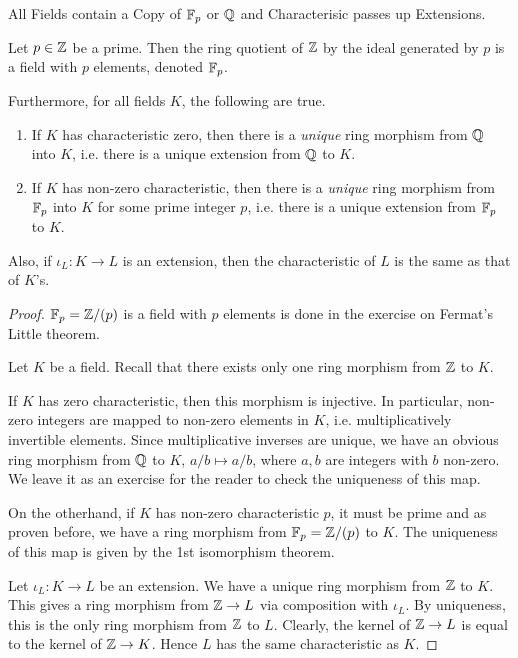 \documentclass[../book.tex]{subfiles}
\begin{document}
\begin{thm} All Fields contain a Copy of $\mathbb{F}_p$ or $\mathbb{Q}$ and 
Characterisic passes up Extensions.
    
    Let $p \in \mathbb{Z}$ be a prime. 
    Then the ring quotient of $\mathbb{Z}$ by the ideal generated by $p$ 
    is a field with $p$ elements, denoted $\mathbb{F}_p$.
    
    Furthermore, for all fields $K$, the following are true. 
    \begin{enumerate}
        \item If $K$ has characteristic zero, 
        then there is a \emph{unique} ring morphism from $\mathbb{Q}$ into $K$,
        i.e. there is a unique extension from $\mathbb{Q}$ to $K$.
        \item If $K$ has non-zero characteristic,
        then there is a \emph{unique} ring morphism from $\mathbb{F}_p$ into $K$
        for some prime integer $p$,
        i.e. there is a unique extension from $\mathbb{F}_p$ to $K$.
    \end{enumerate}
    Also, if $\iota_L : K \to L$ is an extension,
    then the characteristic of $L$ is the same as that of $K$'s.
    
\end{thm}
\begin{proof}
    
    $\mathbb{F}_p = \mathbb{Z} / (p) $ is a field with $p$ elements is done 
    in the exercise on Fermat's Little theorem.
    
    Let $K$ be a field. 
    Recall that there exists only one ring morphism from $\mathbb{Z}$ to $K$. 
    
    If $K$ has zero characteristic, then this morphism is injective.
    In particular, non-zero integers are mapped to non-zero elements in $K$,
    i.e. multiplicatively invertible elements. 
    Since multiplicative inverses are unique, 
    we have an obvious ring morphism from $\mathbb{Q}$ to $K$, 
    $a / b \mapsto a / b$, where $a, b$ are integers with $b$ non-zero. 
    We leave it as an exercise for the reader to check the uniqueness of this map.
    
    On the otherhand, if $K$ has non-zero characteristic $p$, it must be prime
    and as proven before, we have a ring morphism from $\mathbb{F}_p = \mathbb{Z} / (p)$ to $K$.
    The uniqueness of this map is given by the 1st isomorphism theorem.
    
    Let $\iota_L : K \to L$ be an extension.
    We have a unique ring morphism from $\mathbb{Z}$ to $K$.
    This gives a ring morphism from $\mathbb{Z} \to L$ via composition with $\iota_L$.
    By uniqueness, this is the only ring morphism from $\mathbb{Z}$ to $L$.
    Clearly, the kernel of $\mathbb{Z} \to L$ is equal to the kernel of $\mathbb{Z} \to K$.
    Hence $L$ has the same characteristic as $K$.
    
\end{proof}
\end{document}
